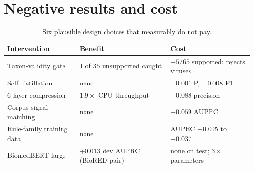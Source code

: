 \documentclass[11pt]{article}
\begin{document}
\section{Negative results and cost}
\label{sec:negative}

\begin{table}[h]\centering\small
\setlength{\tabcolsep}{3pt}
\begin{tabular}{@{}lp{}p{}@{}}
\toprule
Intervention & Benefit & Cost \\
\midrule
Taxon-validity gate & 1 of 35 unsupported caught & $-5/65$ supported; rejects viruses \\
Self-distillation & none & $-0.001$ P, $-0.008$ F1 \\
6-layer compression & $1.9\times$ CPU throughput & $-0.088$ precision \\
Corpus signal-matching & none & $-0.059$ AUPRC \\
Rule-family training data & none & AUPRC $+0.005$ to $-0.037$ \\
BiomedBERT-large & $+0.013$ dev AUPRC (BioRED pair) & none on test; $3\times$ parameters \\
\bottomrule
\end{tabular}
\caption{Six plausible design choices that measurably do not pay.}
\label{tab:negative}
\end{table}
\end{document}
